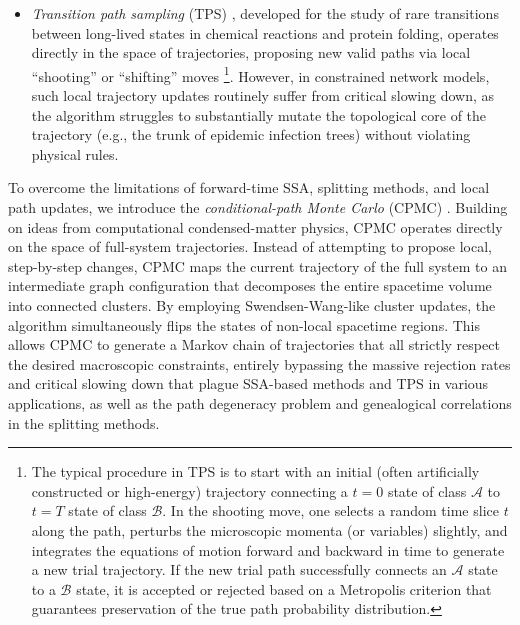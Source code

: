 \documentclass[english,10pt,aps,pra,twocolumn,superscriptaddress,floatfix,fleqn]{revtex4-2}
\newcommand{\mc}[1]{\mathcal{#1}}
\begin{document}
\begin{itemize}
 \item
 \emph{Transition path sampling} (TPS) \cite{Dellago1998-108,Dellago1998-108b,Bolhuis2002-53,Dellago2002-1,Bolhuis2021-4}, developed for the study of rare transitions between long-lived states in chemical reactions and protein folding, operates directly in the space of trajectories, proposing new valid paths via local ``shooting'' or ``shifting'' moves \footnote{The typical procedure in TPS is to start with an initial (often artificially constructed or high-energy) trajectory connecting a $t=0$ state of class $\mc{A}$ to $t=T$ state of class $\mc{B}$. In the shooting move, one selects a random time slice $t$ along the path, perturbs the microscopic momenta (or variables) slightly, and integrates the equations of motion forward and backward in time to generate a new trial trajectory. If the new trial path successfully connects an $\mc{A}$ state to a $\mc{B}$ state, it is accepted or rejected based on a Metropolis criterion that guarantees preservation of the true path probability distribution.}. However, in constrained network models, such local trajectory updates routinely suffer from critical slowing down, as the algorithm struggles to substantially mutate the topological core of the trajectory (e.g., the trunk of epidemic infection trees) without violating physical rules.
\end{itemize}

To overcome the limitations of forward-time SSA, splitting methods, and local path updates, we introduce the \emph{conditional-path Monte Carlo} (CPMC) \cite{Sun2026_08}. Building on ideas from computational condensed-matter physics, CPMC operates directly on the space of full-system trajectories. Instead of attempting to propose local, step-by-step changes, CPMC maps the current trajectory of the full system to an intermediate graph configuration that decomposes the entire spacetime volume into connected clusters. By employing Swendsen-Wang-like cluster updates, the algorithm simultaneously flips the states of non-local spacetime regions. This allows CPMC to generate a Markov chain of trajectories that all strictly respect the desired macroscopic constraints, entirely bypassing the massive rejection rates and critical slowing down that plague SSA-based methods and TPS in various applications, as well as the path degeneracy problem and genealogical correlations in the splitting methods.
\end{document}
